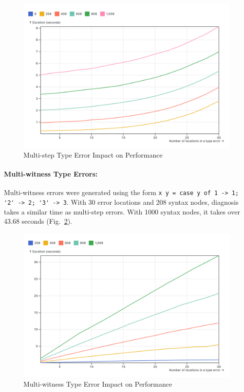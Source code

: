 \documentclass[pdflatex,sn-mathphys-num]{sn-jnl}%
\begin{document}
\begin{figure}[ht]
    \centering
    \includegraphics[width=0.8\linewidth]{images/multi-step.png}
    \caption{Multi-step Type Error Impact on Performance}
    \label{fig:multi-step-time}
\end{figure}

\paragraph{Multi-witness Type Errors:} Multi-witness errors were generated using the form \lstinline{x y = case y of 1 -> 1; '2' -> 2; '3' -> 3}. With 30 error locations and 208 syntax nodes, diagnosis takes a similar time as multi-step errors. With 1000 syntax nodes, it takes over 43.68 seconds (Fig.~\ref{fig:multi-witness-time}).

\begin{figure}[ht]
    \centering
    \includegraphics[width=0.8\linewidth]{images/multi-witness-time.png}
    \caption{Multi-witness Type Error Impact on Performance}
    \label{fig:multi-witness-time}
\end{figure}
\end{document}
